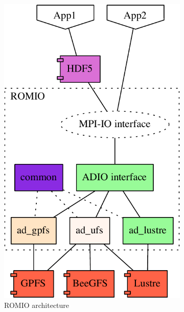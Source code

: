 \begin{figure}[!htb]
  \centering
  \begin{subfigure}[t]{0.38\textwidth}
  \includegraphics[width=\textwidth]{chapters/chapter3/figures/romio-architecture-src.pdf}
  \caption{ROMIO architecture}
  \label{figure: romio-architecture}
  \end{subfigure}
  \begin{subfigure}[t]{0.55\textwidth}

\end{subfigure}
\end{figure}
